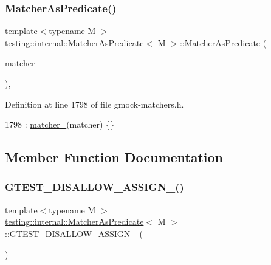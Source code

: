 \subsubsection{\texorpdfstring{Matcher\+As\+Predicate()}{MatcherAsPredicate()}}
{\footnotesize\ttfamily template$<$typename M $>$ \\
\hyperlink{classtesting_1_1internal_1_1MatcherAsPredicate}{testing\+::internal\+::\+Matcher\+As\+Predicate}$<$ M $>$\+::\hyperlink{classtesting_1_1internal_1_1MatcherAsPredicate}{Matcher\+As\+Predicate} (\begin{DoxyParamCaption}\item[{M}]{matcher }\end{DoxyParamCaption})\hspace{0.3cm}{\ttfamily [inline]}, {\ttfamily [explicit]}}



Definition at line 1798 of file gmock-\/matchers.\+h.


\begin{DoxyCode}
1798 : \hyperlink{classtesting_1_1internal_1_1MatcherAsPredicate_a29dddc97262852645d39e11c4bb34b58}{matcher\_}(matcher) \{\}
\end{DoxyCode}


\subsection{Member Function Documentation}
\mbox{\label{classtesting_1_1internal_1_1MatcherAsPredicate_a0495e5defae09e1205ee053b4ca788cf}} 
\subsubsection{\texorpdfstring{G\+T\+E\+S\+T\+\_\+\+D\+I\+S\+A\+L\+L\+O\+W\+\_\+\+A\+S\+S\+I\+G\+N\+\_\+()}{GTEST\_DISALLOW\_ASSIGN\_()}}
{\footnotesize\ttfamily template$<$typename M $>$ \\
\hyperlink{classtesting_1_1internal_1_1MatcherAsPredicate}{testing\+::internal\+::\+Matcher\+As\+Predicate}$<$ M $>$\+::G\+T\+E\+S\+T\+\_\+\+D\+I\+S\+A\+L\+L\+O\+W\+\_\+\+A\+S\+S\+I\+G\+N\+\_\+ (\begin{DoxyParamCaption}\item[{\hyperlink{classtesting_1_1internal_1_1MatcherAsPredicate}{Matcher\+As\+Predicate}$<$ M $>$}]{ }\end{DoxyParamCaption})\hspace{0.3cm}{\ttfamily [private]}}

